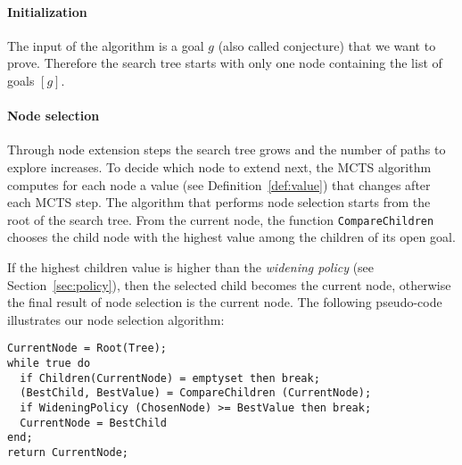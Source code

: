 \documentclass[runningheads,a4paper,draft]{svjour3}
\begin{document}
\paragraph{Initialization}
The input of the algorithm is a goal $g$ (also called conjecture) that we
want to prove. Therefore the search tree starts with only one node containing
the list of goals
$[g]$.


\paragraph{Node selection}
Through node extension steps the search tree grows and the number of paths to
explore increases. To decide which node to extend next, the MCTS algorithm
computes for each node a value (see Definition~\ref{def:value}) that changes
after each MCTS step.
The algorithm that performs
node selection starts from the root of the search tree. From the current node,
the function \texttt{CompareChildren} chooses the child node with the highest
value among the children of its open goal.

If the highest children value is higher than the \textit{widening policy} (see
Section~\ref{sec:policy}), then the
selected child
becomes the current node, otherwise the final result of node selection is the
current node. The following pseudo-code illustrates our node selection
algorithm:

\begin{lstlisting}[language=SMLSmall]
CurrentNode = Root(Tree);
while true do
  if Children(CurrentNode) = emptyset then break;
  (BestChild, BestValue) = CompareChildren (CurrentNode);
  if WideningPolicy (ChosenNode) >= BestValue then break;
  CurrentNode = BestChild
end;
return CurrentNode;
\end{lstlisting}
\end{document}
